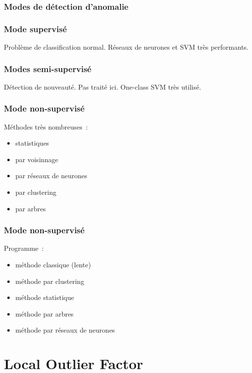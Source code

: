 \documentclass{formation}
\begin{document}
\begin{frame}
  \frametitle{Modes de détection d'anomalie}


\end{frame}

\begin{frame}
  \frametitle{Mode supervisé}

  Problème de classification normal. Réseaux de neurones et SVM très
  performants.


\end{frame}

\begin{frame}
  \frametitle{Modes semi-supervisé}

  Détection de nouveauté. Pas traité ici. One-class SVM très utilisé.
\end{frame}

\begin{frame}
  \frametitle{Mode non-supervisé}

  Méthodes très nombreuses :

  \begin{itemize}[<+->]
  \item statistiques
  \item par voisinnage
  \item par réseaux de neurones
  \item par clustering
  \item par arbres
  \end{itemize}

\end{frame}

\begin{frame}
  \frametitle{Mode non-supervisé}

  Programme :

  \begin{itemize}[<+->]
  \item méthode classique (lente)
  \item méthode par clustering
  \item méthode statistique
  \item méthode par arbres
  \item méthode par réseaux de neurones
  \end{itemize}
\end{frame}

\section{Local Outlier Factor}
\end{document}
